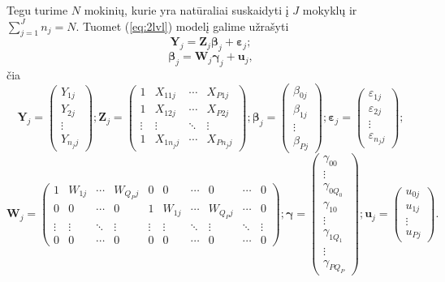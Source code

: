 \documentclass[11pt,a4paper]{article}
\begin{document}
Tegu turime $N$ mokinių, kurie yra natūraliai suskaidyti į $J$ mokyklų ir $\sum^J_{j=1} n_j = N$. Tuomet (\ref{eq:2lvl}) modelį galime užrašyti
\begin{equation}
\mathbf{Y}_j=\mathbf{Z}_j\boldsymbol{\beta}_j+\boldsymbol{\varepsilon}_j;
\end{equation}
\begin{equation}
\boldsymbol{\beta}_{j}=\mathbf{W}_{j}\boldsymbol{\gamma}_{j}+\mathbf{u}_{j},
\end{equation}
čia
\[
\mathbf{Y}_{j} =
\begin{pmatrix}
Y_{1j} \\
Y_{2j} \\
\vdots \\
Y_{n_jj}
\end{pmatrix};
\mathbf{Z}_{j} =
\begin{pmatrix}
1 & X_{11j} & \cdots & X_{P1j} \\
1 & X_{12j} & \cdots & X_{P2j} \\
\vdots & \vdots & \ddots & \vdots \\
1 & X_{1n_jj} & \cdots & X_{Pn_jj}
\end{pmatrix};
\boldsymbol{\beta}_{j} =
\begin{pmatrix}
\beta_{0j} \\
\beta_{1j} \\
\vdots \\
\beta_{Pj}
\end{pmatrix};
\boldsymbol{\varepsilon}_{j} =
\begin{pmatrix}
\varepsilon_{1j} \\
\varepsilon_{2j} \\
\vdots \\
\varepsilon_{n_jj}
\end{pmatrix};
\]
\[
\mathbf{W}_{j} =
\begin{pmatrix}
1& W_{1j} & \cdots & W_{Q_Pj} & 0 & 0 & \cdots & 0 & \cdots & 0\\
0 &0 & \cdots & 0 &1 & W_{1j} & \cdots & W_{Q_Pj} & \cdots &0\\
\vdots & \vdots & \ddots & \vdots & \vdots & \vdots & \ddots & \vdots & \ddots & \vdots\\
0 &0 & \cdots & 0 & 0& 0&\cdots & 0& \cdots & 0
\end{pmatrix};
\boldsymbol{\gamma}=
\begin{pmatrix}
\gamma_{00} \\
\vdots\\
\gamma_{0Q_0} \\
\gamma_{10}\\
\vdots\\
\gamma_{1Q_1} \\
\vdots \\
\gamma_{PQ_P}
\end{pmatrix};
\mathbf{u}_{j} =
\begin{pmatrix}
u_{0j} \\
u_{1j} \\
\vdots \\
u_{Pj}
\end{pmatrix}.
\]
\end{document}
